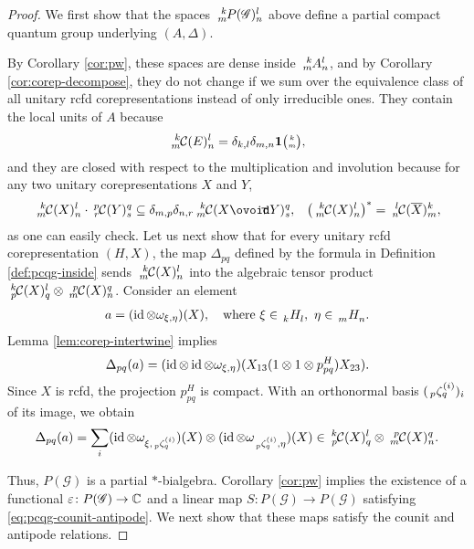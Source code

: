 \begin{proof}
We first show that the spaces $\Gr{P(\mathscr{G})}{k}{l}{m}{n}$  above  define a partial compact quantum group underlying $(A,\Delta)$.

 By Corollary \ref{cor:pw}, these spaces are dense inside $\Gr{A}{k}{l}{m}{n}$, and by Corollary  \ref{cor:corep-decompose}, they do not change if we sum over the equivalence class of all unitary rcfd corepresentations instead of only irreducible ones. They contain the local units of $A$ because
\begin{align*}
  \Gr{\mathcal{C}(E)}{k}{l}{m}{n} = \delta_{k,l}\delta_{m,n} \UnitC{k}{m},
\end{align*}
and they are closed with respect to the multiplication and involution because for any two unitary corepresentations $X$ and $Y$,
  \begin{align*}
    \Gr{\mathcal{C}(X)}{k}{l}{m}{n} \cdot \Gr{\mathcal{C}(Y)}{p}{q}{r}{s} &\subseteq
    \delta_{m,p}\delta_{n,r} \Gr{\mathcal{C}(X\Circt Y)}{k}{q}{m}{s}, &
    \left(\Gr{\mathcal{C}(X)}{k}{l}{m}{n}\right)^{*} = \Gr{\mathcal{C}(\overline{X})}{l}{k}{n}{m},
  \end{align*}
as one can easily check. Let us  next show
that for every unitary rcfd corepresentation $(H,X)$, the map $\Delta_{pq}$ defined by the formula in Definition \ref{def:pcqg-inside} sends $\Gr{\mathcal{C}(X)}{k}{l}{m}{n}$ into the algebraic tensor product
$\Gr{\mathcal{C}(X)}{k}{l}{p}{q} \otimes \Gr{\mathcal{C}(X)}{p}{q}{m}{n}$.  Consider an element
  \begin{align*}
    a = (\id\otimes
  \omega_{\xi,\eta})(X), \quad \text{where } \xi \in \Grd{H}{k}{l}, \ \eta\in \Grd{H}{m}{n}.
  \end{align*}
 Lemma \ref{lem:corep-intertwine} implies
  \begin{align*}
    \Delta_{pq}(a) = (\operatorname{id} \otimes \operatorname{id} \otimes \omega_{\xi,\eta})(X_{13}(1\otimes 1 \otimes p^{H}_{pq})X_{23}).
  \end{align*}
  Since $X$ is rcfd,  the projection $p^{H}_{pq}$ is compact. With an orthonormal
  basis $(\Gr{\zeta}{}{(i)}{p}{q})_{i}$ of its image, we obtain
  \begin{align*}
    \Delta_{pq}(a) = \sum_{i} (\id \otimes \omega_{\xi,\Gr{\zeta}{}{(i)}{p}{q}})(X) \otimes (\id \otimes
    \omega_{\Gr{\zeta}{}{(i)}{p}{q},\eta})(X) \in \Gr{\mathcal{C}(X)}{k}{l}{p}{q} \otimes \Gr{\mathcal{C}(X)}{p}{q}{m}{n}.
  \end{align*}

Thus, $P(\mathscr{G})$ is a partial $*$-bialgebra.  
  Corollary  \ref{cor:pw} implies the existence of a functional $\varepsilon \colon P(\mathscr{G})\to
  \mathbb{C}$ and a  linear map $S\colon P(\mathscr{G})\to P(\mathscr{G})$ satisfying \eqref{eq:pcqg-counit-antipode}.  We next show that these maps satisfy the counit and antipode relations.  


\end{proof}
